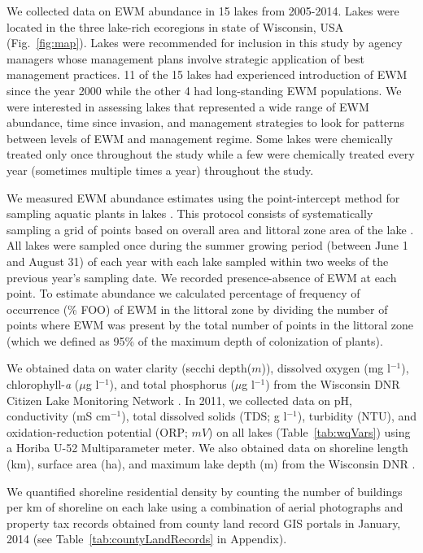 \documentclass{article}
\begin{document}
We collected data on EWM abundance in 15 lakes from 2005-2014. Lakes were located in the three lake-rich ecoregions in state of Wisconsin, USA (Fig.~\ref{fig:map}). Lakes were recommended for inclusion in this study by agency managers whose management plans involve strategic application of best management practices. 11 of the 15 lakes had experienced introduction of EWM since the year 2000 while the other 4 had long-standing EWM populations. We were interested in assessing lakes that represented a wide range of EWM abundance, time since invasion, and management strategies to look for patterns between levels of EWM and management regime. Some lakes were chemically treated only once throughout the study while a few were chemically treated every year (sometimes multiple times a year) throughout the study.

We measured EWM abundance estimates using the point-intercept method for sampling aquatic plants in lakes \citep{Hauxwell2010pi}. This protocol consists of systematically sampling a grid of points based on overall area and littoral zone area of the lake \citep{Mikulyuk2010}. All lakes were sampled once during the summer growing period (between June 1 and August 31) of each year with each lake sampled within two weeks of the previous year's sampling date. We recorded presence-absence of EWM at each point. To estimate abundance we calculated percentage of frequency of occurrence (\% FOO) of EWM in the littoral zone by dividing the number of points where EWM was present by the total number of points in the littoral zone (which we defined as 95\% of the maximum depth of colonization of plants).	

We obtained data on water clarity (secchi depth($m$)), dissolved oxygen (mg l$^{-1}$), chlorophyll-\textit{a} ($\mu$g l$^{-1}$), and total phosphorus ($\mu$g l$^{-1}$) from the Wisconsin DNR Citizen Lake Monitoring Network \citep{swims}. In 2011, we collected data on pH, conductivity (mS cm$^{-1}$), total dissolved solids (TDS; g l$^{-1}$), turbidity (NTU), and oxidation-reduction potential (ORP; $mV$) on all lakes (Table~\ref{tab:wqVars}) using a Horiba U-52 Multiparameter meter. We also obtained data on shoreline length (km), surface area (ha), and maximum lake depth (m) from the Wisconsin DNR \citep[Table~\ref{tab:lakeInfo}][]{WDNRLakes}.

We quantified shoreline residential density by counting the number of buildings per km of shoreline on each lake using a combination of aerial photographs and property tax records obtained from county land record GIS portals in January, 2014 (see Table~\ref{tab:countyLandRecords} in Appendix).
\end{document}
